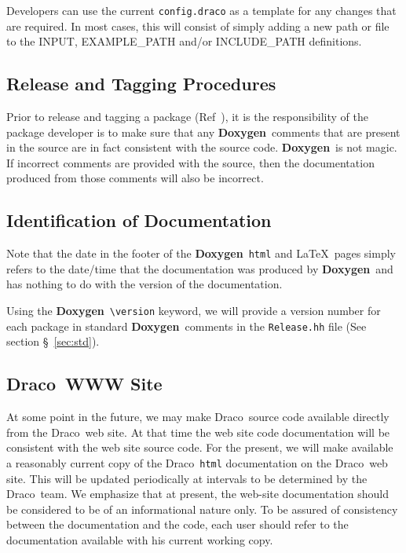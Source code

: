 \documentclass[11pt]{nmemo}
\newcommand{\draco}{{\normalfont\sffamily Draco}}
\newcommand{\doxy}{{\normalfont\bfseries Doxygen}}
\begin{document}
Developers can use the current \texttt{config.draco} as a template for
any changes that are required. In most cases, this will consist of
simply adding a new path or file to the INPUT, EXAMPLE\_PATH and/or 
INCLUDE\_PATH definitions.


\subsection{Release and Tagging Procedures}
\label{sec:reltag}
Prior to release and tagging a package (Ref~\cite{xtm:9936}), it is 
the responsibility of the package developer is to make sure that any \doxy\
comments that are present in the source are in fact consistent with the
source code. \doxy\ is not magic. If incorrect comments are provided with
the source, then the documentation produced from those comments will also
be incorrect.

\subsection{Identification of Documentation}

Note that the date in the footer of the \doxy\ \texttt{html} and \LaTeX\
pages
simply refers to the date/time that the documentation was produced by \doxy\, 
and has nothing to do with the version of the documentation.

Using the \doxy\  \verb+\version+ keyword, we will provide 
a version number for each package in standard \doxy\ comments in the 
\texttt{Release.hh} file (See section \S~\ref{sec:std}).

\subsection{\draco\ WWW Site}
\label{sec:www}

At some point in the future, we may make \draco\ source code available
directly from the \draco\ web site. At that time the web site code
documentation will be consistent with the web site source code.
For the present, 
we will make available a reasonably current copy of the \draco\ \texttt{html}
documentation on the \draco\ web site. This will be updated periodically
at intervals to be determined by the \draco\ team. 
We emphasize that at present, the web-site documentation should be 
considered to be of an informational nature only. To be assured of
consistency between the documentation and the code, each
user should refer to the documentation available with 
his current working copy.
\end{document}
